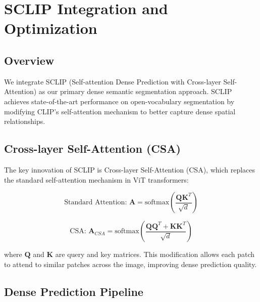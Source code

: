 
\section{SCLIP Integration and Optimization}

\subsection{Overview}

We integrate SCLIP (Self-attention Dense Prediction with Cross-layer Self-Attention) \cite{sclip2024} as our primary dense semantic segmentation approach. SCLIP achieves state-of-the-art performance on open-vocabulary segmentation by modifying CLIP's self-attention mechanism to better capture dense spatial relationships.

\subsection{Cross-layer Self-Attention (CSA)}

The key innovation of SCLIP is Cross-layer Self-Attention (CSA), which replaces the standard self-attention mechanism in ViT transformers:

\begin{equation}
\text{Standard Attention: } \mathbf{A} = \text{softmax}\left(\frac{\mathbf{Q}\mathbf{K}^T}{\sqrt{d}}\right)
\end{equation}

\begin{equation}
\text{CSA: } \mathbf{A}_{CSA} = \text{softmax}\left(\frac{\mathbf{Q}\mathbf{Q}^T + \mathbf{K}\mathbf{K}^T}{\sqrt{d}}\right)
\end{equation}

where $\mathbf{Q}$ and $\mathbf{K}$ are query and key matrices. This modification allows each patch to attend to similar patches across the image, improving dense prediction quality.

\subsection{Dense Prediction Pipeline}

